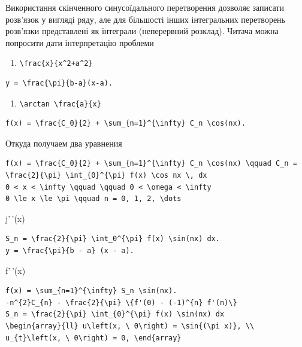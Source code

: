 \documentclass[
  ukrainian,
]{article}
\providecommand{\tightlist}{%
  \setlength{\itemsep}{0pt}\setlength{\parskip}{0pt}}
\begin{document}
Використання скінченного синусоїдального перетворення дозволяє записати
розв'язок у вигляді ряду, але для більшості інших інтегральних
перетворень розв'язки представлені як інтеграли (неперервний розклад).
Читача можна попросити дати інтерпретацію проблеми

\begin{enumerate}
\def\labelenumi{\arabic{enumi}.}
\setcounter{enumi}{6}
\tightlist
\item
  \texttt{\textbackslash{}frac\{x\}\{x\^{}2+a\^{}2\}}
\end{enumerate}

\begin{verbatim}
y = \frac{\pi}{b-a}(x-a).
\end{verbatim}

\begin{enumerate}
\def\labelenumi{\arabic{enumi}.}
\setcounter{enumi}{8}
\tightlist
\item
  \texttt{\textbackslash{}arctan\ \textbackslash{}frac\{a\}\{x\}}
\end{enumerate}

\begin{verbatim}
f(x) = \frac{C_0}{2} + \sum_{n=1}^{\infty} C_n \cos(nx).
\end{verbatim}

Откуда получаем два уравнения

\begin{verbatim}
f(x) = \frac{C_0}{2} + \sum_{n=1}^{\infty} C_n \cos(nx) \qquad C_n = \frac{2}{\pi} \int_{0}^{\pi} f(x) \cos nx \, dx
0 < x < \infty \qquad \qquad 0 < \omega < \infty
0 \le x \le \pi \qquad n = 0, 1, 2, \dots
\end{verbatim}

j'\,'(x)

\begin{verbatim}
S_n = \frac{2}{\pi} \int_0^{\pi} f(x) \sin(nx) dx.
y = \frac{\pi}{b - a} (x - a).
\end{verbatim}

f'\,'(x)

\begin{verbatim}
f(x) = \sum_{n=1}^{\infty} S_n \sin(nx).
-n^{2}C_{n} - \frac{2}{\pi} \{f'(0) - (-1)^{n} f'(n)\}
S_n = \frac{2}{\pi} \int_{0}^{\pi} f(x) \sin(nx) dx
\begin{array}{ll} u\left(x, \ 0\right) = \sin{(\pi x)}, \\ u_{t}\left(x, \ 0\right) = 0, \end{array}
\end{verbatim}
\end{document}
